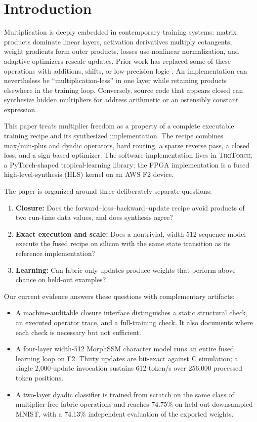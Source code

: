 \documentclass[10pt]{article}
\newcommand{\tikitorch}{\textsc{TikiTorch}}
\begin{document}
\section{Introduction}

Multiplication is deeply embedded in contemporary training systems: matrix
products dominate linear layers, activation derivatives multiply cotangents,
weight gradients form outer products, losses use nonlinear normalization, and
adaptive optimizers rescale updates.  Prior work has replaced some of these
operations with additions, shifts, or low-precision logic
\cite{deepShift,addernet,shiftaddnet,liu2023multfree}.  An implementation can
nevertheless be ``multiplication-less'' in one layer while retaining products
elsewhere in the training loop.  Conversely, source code that appears closed
can synthesize hidden multipliers for address arithmetic or an ostensibly
constant expression.

This paper treats multiplier freedom as a property of a complete executable
training recipe and its synthesized implementation.  The recipe combines
max/min-plus and dyadic operators, hard routing, a sparse reverse pass, a closed
loss, and a sign-based optimizer.  The software implementation lives in
\tikitorch, a PyTorch-shaped tropical-learning library; the FPGA implementation
is a fused high-level-synthesis (HLS) kernel on an AWS F2 device.

The paper is organized around three deliberately separate questions:

\begin{enumerate}
  \item \textbf{Closure:} Does the forward--loss--backward--update recipe avoid
  products of two run-time data values, and does synthesis agree?
  \item \textbf{Exact execution and scale:} Does a nontrivial, width-512
  sequence model execute the fused recipe on silicon with the same state
  transition as its reference implementation?
  \item \textbf{Learning:} Can fabric-only updates produce weights that perform
  above chance on held-out examples?
\end{enumerate}

Our current evidence answers these questions with complementary artifacts:

\begin{itemize}
  \item A machine-auditable closure interface distinguishes a static structural
  check, an executed operator trace, and a full-training check.  It also
  documents where each check is necessary but not sufficient.
  \item A four-layer width-512 MorphSSM character model runs an entire fused
  learning loop on F2.  Thirty updates are bit-exact against C simulation; a
  single 2,000-update invocation sustains 612 token/s over 256,000 processed
  token positions.
  \item A two-layer dyadic classifier is trained from scratch on the same class
  of multiplier-free fabric operations and reaches 74.75\% on held-out
  downsampled MNIST, with a 74.13\% independent evaluation of the exported
  weights.
\end{itemize}
\end{document}
